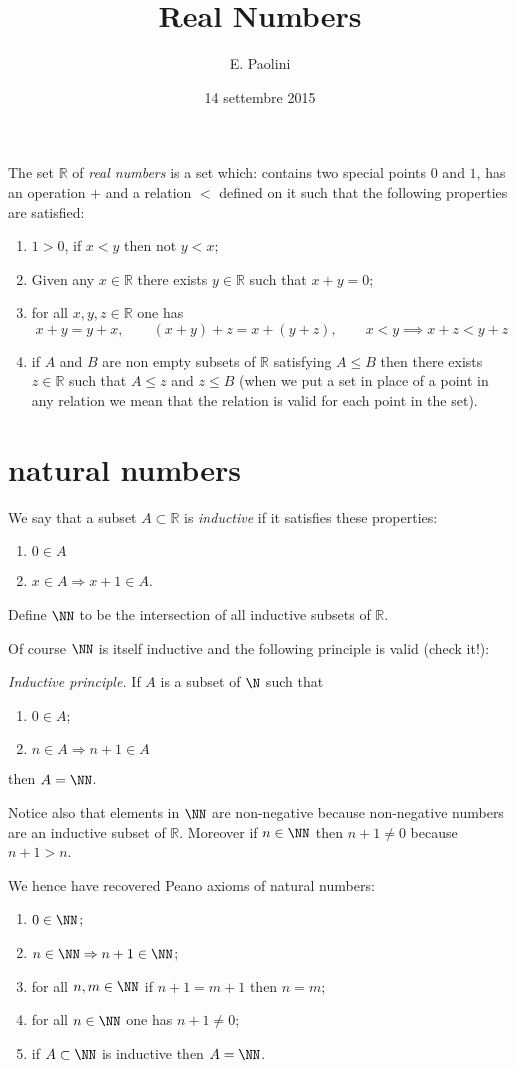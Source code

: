\documentclass[italian,a4paper]{scrartcl}
\title{Real Numbers}
\author{E. Paolini}
\date{14 settembre 2015}
\newcommand{\RR}{{\mathbb R}}
\begin{document}
\maketitle

The set $\RR$ of \emph{real numbers} is a set which: contains two special points
$0$ and $1$, has an operation $+$ and a relation $<$ defined on it
such that the following properties are satisfied:

\begin{enumerate}
\item
$1>0$, if $x<y$ then not $y<x$;
\item
Given any $x\in \RR$ there exists $y\in \RR$ such that $x+y=0$;
\item
for all $x,y,z\in \RR$ one has
\[
 x+y = y+x, \qquad
 (x+y)+z = x+(y+z), \qquad
 x < y \implies  x+z < y+z
\]
\item
if $A$ and $B$ are non empty subsets of $\RR$ satisfying $A\le B$ then there exists
$z\in \RR$ such that $A \le z$ and $z \le B$
(when we put a set in place of a point in any relation we mean that the relation
is valid for each point in the set).
\end{enumerate}

\section{natural numbers}

We say that a subset $A\subset \RR$ is \emph{inductive} if it satisfies these properties:
\begin{enumerate}
\item $0\in A$
\item $x\in A \Rightarrow x+1 \in A$.
\end{enumerate}
Define $\NN$ to be the intersection of all inductive subsets of $\RR$.

Of course $\NN$ is itself inductive and the following principle is valid
(check it!):

\emph{Inductive principle.} If $A$ is a subset of $\N$ such that
\begin{enumerate}
\item $0\in A$;
\item $n\in A \Rightarrow n+1 \in A$
\end{enumerate}
then $A=\NN$.

Notice also that elements in $\NN$ are non-negative because non-negative numbers
are an inductive subset of $\RR$. Moreover if $n\in \NN$ then
$n+1 \neq 0$ because $n+1 > n$.

We hence have recovered Peano axioms of natural numbers:
\begin{enumerate}
\item $0 \in \NN$;
\item $n \in \NN \Rightarrow n+1 \in \NN$;
\item for all $n,m \in \NN$ if $n+1 = m+1$ then $n=m$;
\item for all $n\in \NN$ one has $n+1 \neq 0$;
\item if $A\subset \NN$ is inductive then $A= \NN$.
\end{enumerate}
\end{document}
